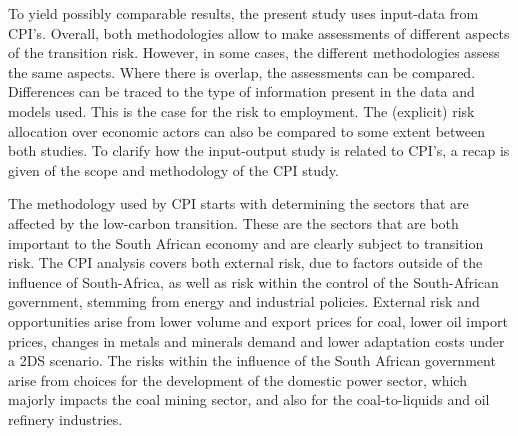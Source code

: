 \documentclass[12pt,english]{article}
\begin{document}
To yield possibly comparable results, the present study uses input-data from CPI's.
Overall, both methodologies allow to make assessments of different aspects of the transition risk. However, in some cases, the different methodologies assess the same aspects. %
Where there is overlap, the assessments can be compared. Differences can be traced to the type of information present in the data and models used. This is the case for the risk %
to employment. %
The (explicit) risk allocation over economic actors can also be compared to some extent between both studies. %
To clarify how the input-output study is related to CPI's, a recap is given of the scope and methodology of the CPI study. 

The methodology used by CPI starts with determining the sectors that are affected by the low-carbon transition. These are the sectors that are both important to the South African economy and are clearly subject to transition risk. 
The CPI analysis covers both external risk, due to factors outside of the influence of South-Africa, as well as risk within the control of the South-African government, stemming from energy and industrial policies. External risk and opportunities arise from lower volume and export prices for coal, lower oil import prices, changes in metals and minerals demand and lower adaptation costs under a 2DS scenario.
The risks within the influence of the South African government arise from choices for the development of the domestic power sector, which majorly impacts the coal mining sector, and also for the coal-to-liquids and oil refinery industries. 
\end{document}
